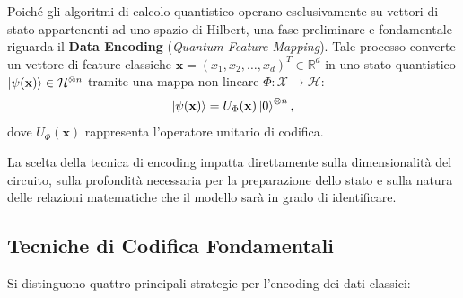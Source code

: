 Poiché gli algoritmi di calcolo quantistico operano esclusivamente su vettori di stato appartenenti ad uno spazio di Hilbert, una fase preliminare e fondamentale riguarda il \textbf{Data Encoding} (\textit{Quantum Feature Mapping}). Tale processo converte un vettore di feature classiche $\mathbf{x} = (x_1, x_2, \dots, x_d)^T \in \mathbb{R}^d$ in uno stato quantistico $\ket{\psi(\mathbf{x})} \in \mathcal{H}^{\otimes n}$ tramite una mappa non lineare $\Phi: \mathcal{X} \to \mathcal{H}$:
\begin{equation}
\ket{\psi(\mathbf{x})} = U_{\Phi}(\mathbf{x}) \ket{0}^{\otimes n},
\end{equation}
dove $U_{\Phi}(\mathbf{x})$ rappresenta l'operatore unitario di codifica.

La scelta della tecnica di encoding impatta direttamente sulla dimensionalità del circuito, sulla profondità necessaria per la preparazione dello stato e sulla natura delle relazioni matematiche che il modello sarà in grado di identificare.

\subsection{Tecniche di Codifica Fondamentali}

Si distinguono quattro principali strategie per l'encoding dei dati classici:

